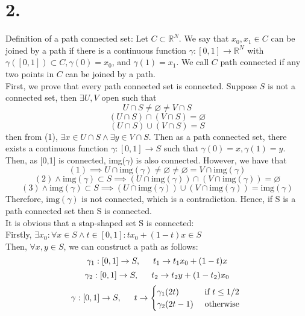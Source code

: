 \documentclass[11pt]{article}
\begin{document}
\section*{2.}
Definition of a path connected set:  Let $C \subset \mathbb{R}^N$. We say that $x_0, x_1 \in C$ can be joined by a path if there is a continuous function $\gamma : [0, 1] \to \mathbb{R}^N$ with $\gamma([0, 1]) \subset C, \gamma(0) = x_0$, and $\gamma(1) = x_1$. We call $C$ path connected if any two points in $C$ can be joined by a path. \\ 
First, we prove that every path connected set is connected. Suppose $S$ is not a connected set, 
then $\exists U,V$ open such that \\
\begin{equation} U \cap S \ne \varnothing \ne V \cap S\end{equation}
\begin{equation}(U \cap S) \cap (V \cap S) = \varnothing\end{equation}
\begin{equation}(U \cap S) \cup (V \cap S) = S\end{equation}
then from (1), $\exists x \in U \cap S \land \exists y \in V \cap S$. Then as a path connected set, there exists a continuous function $\gamma: [0,1] \to S$ such that $\gamma(0) = x, \gamma(1) = y$.\\
Then, as [0,1] is connected, img($\gamma$) is also connected. However, we have that 
\[
(1) \implies U \cap \text{img}(\gamma) \ne \varnothing \ne \varnothing = V \cap \text{img}(\gamma)
\]
\[
(2) \land \text{img}(\gamma) \subset S \implies (U \cap \text{img}(\gamma)) \cap (V \cap \text{img}(\gamma)) = \varnothing
\]
\[
(3) \land \text{img}(\gamma) \subset S \implies (U \cap \text{img}(\gamma))  \cup (V \cap \text{img}(\gamma)) = \text{img}(\gamma)
\]
Therefore, $\text{img}(\gamma)$ is not connected, which is a contradiction. Hence, if S is a path connected set then S is connected. \\
It is obvious that a stap-shaped set S is connected: \\
Firstly, $\exists x_0: \forall x \in S \land t \in [0,1]: tx_0 + (1-t)x \in S$ \\
Then, $\forall x,y \in S$, we can construct a path as follows: \\
\[\gamma_1: [0,1] \to S, \indent t_1 \to t_1x_0 + (1-t)x\]
\[\gamma_2: [0,1] \to S, \indent t_2 \to t_2y + (1-t_2)x_0\]
\[
\gamma: [0,1] \to S, \indent t \to \begin{cases} \gamma_1(2t) &\text{ if } t \le 1/2 \\ \gamma_2(2t-1) &\text{ otherwise }\end{cases}
\]
\end{document}

